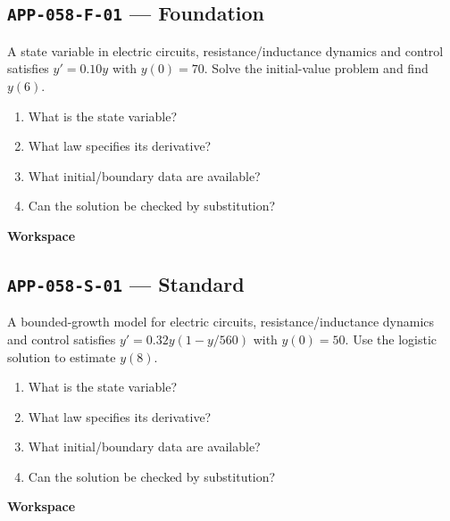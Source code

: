 \documentclass[11pt]{book}
\newcommand{\pid}[1]{\texttt{#1}}
\newcommand{\workspace}{\par\vspace{0.7in}\hrulefill\par\vspace{0.55in}\hrulefill\par}
\begin{document}
\subsection*{\pid{APP-058-F-01} — Foundation}
\begin{problembox}
A state variable in electric circuits, resistance/inductance dynamics and control satisfies $y'=0.10y$ with $y(0)=70$. Solve the initial-value problem and find $y(6)$.
\end{problembox}
\begin{promptbox}\begin{enumerate}
\item What is the state variable?
\item What law specifies its derivative?
\item What initial/boundary data are available?
\item Can the solution be checked by substitution?
\end{enumerate}\end{promptbox}
\textbf{Workspace}\workspace
{}
\subsection*{\pid{APP-058-S-01} — Standard}
\begin{problembox}
A bounded-growth model for electric circuits, resistance/inductance dynamics and control satisfies $y'=0.32y(1-y/560)$ with $y(0)=50$. Use the logistic solution to estimate $y(8)$.
\end{problembox}
\begin{promptbox}\begin{enumerate}
\item What is the state variable?
\item What law specifies its derivative?
\item What initial/boundary data are available?
\item Can the solution be checked by substitution?
\end{enumerate}\end{promptbox}
\textbf{Workspace}\workspace
{}
\end{document}
